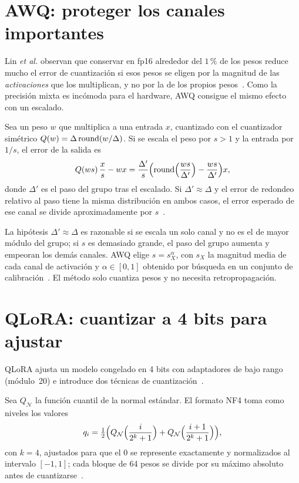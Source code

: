 \section{AWQ: proteger los canales importantes}

Lin \emph{et al.} observan que conservar en fp16 alrededor del $1\,\%$ de los pesos reduce mucho el error de cuantización si esos pesos se eligen por la magnitud de las \emph{activaciones} que los multiplican, y no por la de los propios pesos~\cite[§3.1]{awq}. Como la precisión mixta es incómoda para el hardware, AWQ consigue el mismo efecto con un escalado.

\begin{proposicion}\label{prop:awq}
Sea un peso $w$ que multiplica a una entrada $x$, cuantizado con el cuantizador simétrico $Q(w)=\Delta\operatorname{round}(w/\Delta)$. Si se escala el peso por $s>1$ y la entrada por $1/s$, el error de la salida es
\[
Q(ws)\,\frac{x}{s}-wx=\frac{\Delta'}{s}\Bigl(\operatorname{round}\Bigl(\frac{ws}{\Delta'}\Bigr)-\frac{ws}{\Delta'}\Bigr)x,
\]
donde $\Delta'$ es el paso del grupo tras el escalado. Si $\Delta'\approx\Delta$ y el error de redondeo relativo al paso tiene la misma distribución en ambos casos, el error esperado de ese canal se divide aproximadamente por $s$~\cite[§3.2, ecs.~2 y~3]{awq}.
\end{proposicion}

La hipótesis $\Delta'\approx\Delta$ es razonable si se escala un solo canal y no es el de mayor módulo del grupo; si $s$ es demasiado grande, el paso del grupo aumenta y empeoran los demás canales. AWQ elige $s=s_X^{\alpha}$, con $s_X$ la magnitud media de cada canal de activación y $\alpha\in[0,1]$ obtenido por búsqueda en un conjunto de calibración~\cite[§3.2, ec.~5]{awq}. El método solo cuantiza pesos y no necesita retropropagación.

\section{QLoRA: cuantizar a 4 bits para ajustar}

QLoRA ajusta un modelo congelado en 4 bits con adaptadores de bajo rango (módulo~20) e introduce dos técnicas de cuantización~\cite[§3]{qlora}.

\begin{definicion}\label{def:nf4}
Sea $Q_{\mathcal{N}}$ la función cuantil de la normal estándar. El formato NF4 toma como niveles los valores
\[
q_i=\tfrac12\Bigl(Q_{\mathcal{N}}\Bigl(\frac{i}{2^{k}+1}\Bigr)+Q_{\mathcal{N}}\Bigl(\frac{i+1}{2^{k}+1}\Bigr)\Bigr),
\]
con $k=4$, ajustados para que el $0$ se represente exactamente y normalizados al intervalo $[-1,1]$; cada bloque de 64 pesos se divide por su máximo absoluto antes de cuantizarse~\cite[§3, ec.~4]{qlora}.
\end{definicion}

